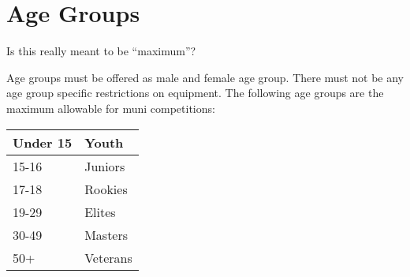 \section{Age Groups}

\begin{comment2016}%
Is this really meant to be ``maximum''?
\end{comment2016}

Age groups must be offered as male and female age group.
There must not be any age group specific restrictions on equipment.
The following age groups are the maximum allowable for muni competitions:

\begin{tabular}{|l|l|}
\hline
Under 15 & Youth \\
\hline
15-16 & Juniors \\
\hline
17-18 & Rookies \\
\hline
19-29 & Elites \\
\hline
30-49 & Masters \\
\hline
50+ & Veterans \\
\hline
\end{tabular}

